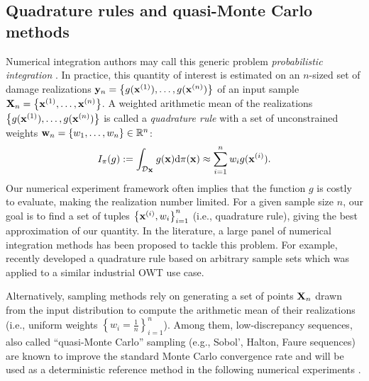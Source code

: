 \subsection{Quadrature rules and quasi-Monte Carlo methods}
Numerical integration authors may call this generic problem \emph{probabilistic integration} \citep{briol_oates_2019}. 
In practice, this quantity of interest is estimated on an $n$-sized set of damage realizations ${\bf y}_n = \left\{g({\bf x}^{(1)}), \dots, g({\bf x}^{(n)})\right\}$ of an input sample ${\bf X}_n = \left\{{\bf x}^{(1)}, \dots, {\bf x}^{(n)}\right\}$. 
A weighted arithmetic mean of the realizations $\left\{g({\bf x}^{(1)}), \dots, g({\bf x}^{(n)})\right\}$ is called a \emph{quadrature rule} with a set of unconstrained weights ${\bf w}_n = \{w_1, \dots, w_n\} \in \mathbb{R}^n$:
\begin{equation}
    I_{\pi}(g) := \int_{\mathcal{D}_{\bf X}} g({\bf x}) \mathrm{d}\pi({\bf x}) \approx \sum_{i=1}^n w_i g({\bf x}^{(i)}).
    \label{eq:quadrature_rule}
\end{equation}
Our numerical experiment framework often implies that the function $g$ is costly to evaluate, making the realization number limited. 
For a given sample size $n$, our goal is to find a set of tuples $\left\{{\bf x}^{(i)}, w_i \right\}_{i=1}^n$ (i.e., quadrature rule), giving the best approximation of our quantity. 
In the literature, a large panel of numerical integration methods has been proposed to tackle this problem. 
For example, \cite{bos_2020} recently developed a quadrature rule based on arbitrary sample sets which was applied to a similar industrial OWT use case.  

Alternatively, sampling methods rely on generating a set of points ${\bf X}_n$ drawn from the input distribution to compute the arithmetic mean of their realizations (i.e., uniform weights $\left\{w_i = \frac1n \right\}_{i=1}^n$). 
Among them, low-discrepancy sequences, also called ``quasi-Monte Carlo'' sampling (e.g., Sobol', Halton, Faure sequences) are known to improve the standard Monte Carlo convergence rate and will be used as a deterministic reference method in the following numerical experiments \citep{leobacher_2014}.

